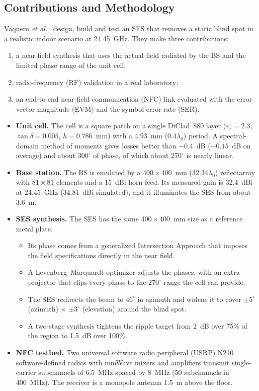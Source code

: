 \subsection{Contributions and Methodology}
Vaquero \textit{et al.}~\cite{Vaquero2026} design, build and test an SES that removes a static blind spot in a realistic indoor scenario at 24.45~GHz. They make three contributions:
\begin{enumerate}
    \item a near-field synthesis that uses the actual field radiated by the BS and the limited phase range of the unit cell;
    \item radio-frequency (RF) validation in a real laboratory;
    \item an end-to-end near-field communication (NFC) link evaluated with the error vector magnitude (EVM) and the symbol error rate (SER).
\end{enumerate}
\begin{itemize}
    \item \textbf{Unit cell.} The cell is a square patch on a single DiClad~880 layer ($\varepsilon_r = 2.3$, $\tan\delta = 0.005$, $h = 0.786$~mm) with a 4.93~mm ($0.4\lambda_0$) period. A spectral-domain method of moments gives losses better than $-0.4$~dB ($-0.15$~dB on average) and about $300^\circ$ of phase, of which about $270^\circ$ is nearly linear.
    \item \textbf{Base station.} The BS is emulated by a $400 \times 400$~mm ($32.34\lambda_0$) reflectarray with $81 \times 81$ elements and a 15~dBi horn feed. Its measured gain is 32.4~dBi at 24.45~GHz (34.81~dBi simulated), and it illuminates the SES from about 3.6~m.
    \item \textbf{SES synthesis.} The SES has the same $400 \times 400$~mm size as a reference metal plate.
    \begin{itemize}
        \item Its phase comes from a generalized Intersection Approach that imposes the field specifications directly in the near field.
        \item A Levenberg--Marquardt optimizer adjusts the phases, with an extra projector that clips every phase to the $270^\circ$ range the cell can provide.
        \item The SES redirects the beam to $46^\circ$ in azimuth and widens it to cover $\pm 5^\circ$ (azimuth) $\times$ $\pm 3^\circ$ (elevation) around the blind spot.
        \item A two-stage synthesis tightens the ripple target from 2~dB over 75\% of the region to 1.5~dB over 100\%.
    \end{itemize}
    \item \textbf{NFC testbed.} Two universal software radio peripheral (USRP) N210 software-defined radios with mmWave mixers and amplifiers transmit single-carrier subchannels of 6.5~MHz spaced by 8~MHz (50 subchannels in 400~MHz). The receiver is a monopole antenna 1.5~m above the floor.
\end{itemize}

